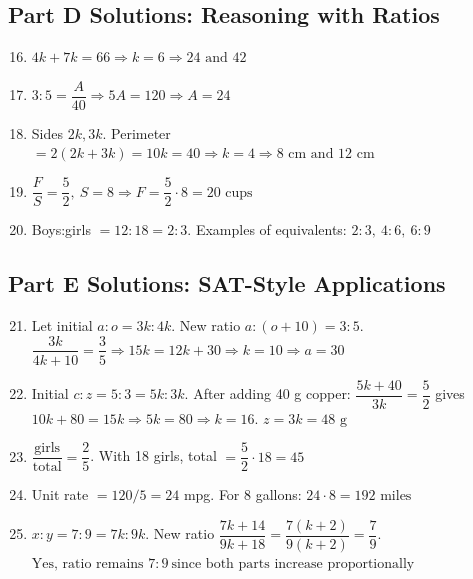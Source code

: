 \documentclass[14pt]{extarticle}
\begin{document}
\subsection*{Part D Solutions: Reasoning with Ratios}
\begin{enumerate}
  \setcounter{enumi}{15}
  \item \(4k+7k=66 \Rightarrow k=6 \Rightarrow \boxed{24\text{ and }42}\)
  \item \(3:5=\dfrac{A}{40} \Rightarrow 5A=120 \Rightarrow \boxed{A=24}\)
  \item Sides \(2k,3k\). Perimeter \(=2(2k+3k)=10k=40 \Rightarrow k=4 \Rightarrow \boxed{8\text{ cm and }12\text{ cm}}\)
  \item \(\dfrac{F}{S}=\dfrac{5}{2},\ S=8 \Rightarrow F=\dfrac{5}{2}\cdot8=\boxed{20\text{ cups}}\)
  \item Boys:girls \(=12:18=2:3\). Examples of equivalents: \(\boxed{2:3,\ 4:6,\ 6:9}\)
\end{enumerate}

\subsection*{Part E Solutions: SAT-Style Applications}
\begin{enumerate}
  \setcounter{enumi}{20}
  \item Let initial \(a:o=3k:4k\). New ratio \(a:(o+10)=3:5\).  
  \( \dfrac{3k}{4k+10}=\dfrac{3}{5} \Rightarrow 15k=12k+30 \Rightarrow k=10 \Rightarrow \boxed{a=30}\)
  \item Initial \(c:z=5:3=5k:3k\). After adding 40 g copper: \(\dfrac{5k+40}{3k}=\dfrac{5}{2}\) gives \(10k+80=15k \Rightarrow 5k=80 \Rightarrow k=16\).
  \(\boxed{z=3k=48\text{ g}}\)
  \item \(\dfrac{\text{girls}}{\text{total}}=\dfrac{2}{5}\). With 18 girls, total \(=\dfrac{5}{2}\cdot18=\boxed{45}\)
  \item Unit rate \(=120/5=24\) mpg. For 8 gallons: \(24\cdot8=\boxed{192\text{ miles}}\)
  \item \(x:y=7:9=7k:9k\). New ratio \(\dfrac{7k+14}{9k+18}=\dfrac{7(k+2)}{9(k+2)}=\dfrac{7}{9}\).  \newline
  \(\boxed{\text{Yes, ratio remains }7:9\ \text{since both parts increase proportionally}}\)
\end{enumerate}





\end{document}
